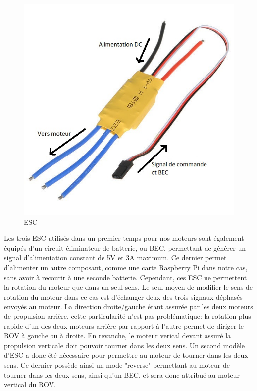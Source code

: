 \documentclass[a4paper,11pt]{report}
\begin{document}
			\begin{figure}[!h]
				\begin{center}
					\includegraphics[scale=1.8]{Photos/esc}
					\caption{ESC}
				\end{center}
			\end{figure}
			\newpage 
			Les trois ESC utilisés dans un premier temps pour nos moteurs \cite{ref6} sont également équipés d'un circuit éliminateur de batterie, ou BEC, permettant de générer un signal d'alimentation constant de 5V et 3A maximum. Ce dernier permet d'alimenter un autre composant, comme une carte Raspberry Pi dans notre cas, sans avoir à recourir à une seconde batterie. 
			\newline\newline Cependant, ces ESC ne permettent la rotation du moteur que dans un seul sens. Le seul moyen de modifier le sens de rotation du moteur dans ce cas est d'échanger deux des trois signaux déphasés envoyés au moteur. La direction droite/gauche étant assurée par les deux moteurs de propulsion arrière, cette particularité n'est pas problématique: la rotation plus rapide d'un des deux moteurs arrière par rapport à l'autre permet de diriger le ROV à gauche ou à droite. En revanche, le moteur verical devant assuré la propulsion verticale doit pouvoir tourner dans les deux sens. Un second modèle d'ESC a donc été nécessaire pour permettre au moteur de tourner dans les deux sens. Ce dernier \cite{ref7} possède ainsi un mode "reverse" permettant au moteur de tourner dans les deux sens, ainsi qu'un BEC, et sera donc attribué au moteur vertical du ROV.
	
\end{document}
